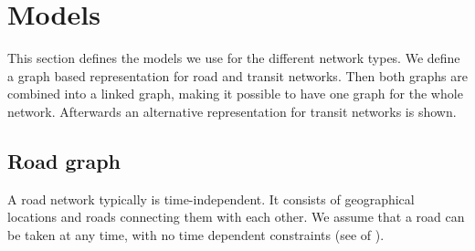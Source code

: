 \chapter{Models}\label{models}
	This section defines the models we use for the different network types. We define a graph
	based representation for road and transit networks. Then both graphs are combined
	into a linked graph, making it possible to have one graph for the whole network.
	Afterwards an alternative representation for transit networks is shown.
	
\section{Road graph}\label{roadGraphSec}
	A road network typically is time-independent. It consists of geographical locations and roads connecting them with each other.
	We assume that a road can be taken at any time, with no time dependent constraints (see  of ).
	

